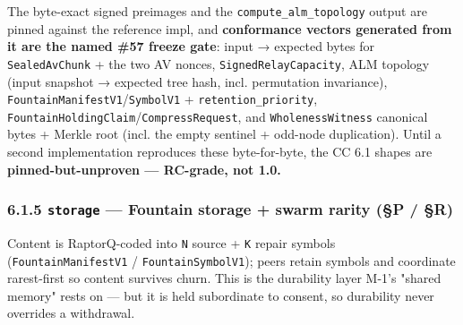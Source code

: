 \documentclass[11pt]{article}
\begin{document}
The byte-exact signed preimages and the \texttt{compute\_alm\_topology} output are pinned against the reference impl, and \textbf{conformance vectors generated from it are the named \#57 freeze gate}: input → expected bytes for \texttt{SealedAvChunk} + the two AV nonces, \texttt{SignedRelayCapacity}, ALM topology (input snapshot → expected tree hash, incl. permutation invariance), \texttt{FountainManifestV1}/\texttt{SymbolV1} + \texttt{retention\_priority}, \texttt{FountainHoldingClaim}/\texttt{CompressRequest}, and \texttt{WholenessWitness} canonical bytes + Merkle root (incl. the empty sentinel + odd-node duplication). Until a second implementation reproduces these byte-for-byte, the CC 6.1 shapes are \textbf{pinned-but-unproven — RC-grade, not 1.0.}


\subsubsection*{6.1.5 \texttt{storage} — Fountain storage + swarm rarity (§P / §R)}


Content is RaptorQ-coded into \texttt{N} source + \texttt{K} repair symbols (\texttt{FountainManifestV1} / \texttt{FountainSymbolV1}); peers retain symbols and coordinate rarest-first so content survives churn. This is the durability layer M-1's "shared memory" rests on — but it is held subordinate to consent, so durability never overrides a withdrawal.
\end{document}
